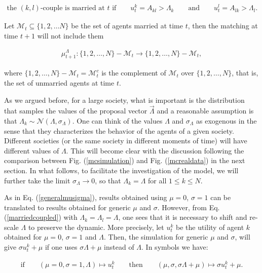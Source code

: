 \documentclass[12pt]{article}
\begin{document}
\begin{align}
    \textrm{the $(k,l)$-couple is married at $t$ if}\qquad u^k_t=A_{kl}>\Lambda_k\qquad \textrm{and}\qquad u^l_t=A_{lk}>\Lambda_l.
    \label{marriedcoupled}
\end{align}

\noindent Let $\mathcal{M}_{t}\subseteq\{1,2,\dots N\}$ be the set of agents married at time $t$, then the matching at time $t+1$ will not include them

\begin{align}
    \mu_{t+1}^\Lambda:\{1,2,\dots,N\}-\mathcal{M}_{t}\rightarrow\{1,2,\dots,N\}-\mathcal{M}_{t},
    \label{marriedcouples}
\end{align}

\noindent where $\{1,2,\dots,N\}-\mathcal{M}_{t}=\mathcal{M}^c_t$ is the complement of $\mathcal{M}_t$ over $\{1,2,\dots,N\}$, that is, the set of unmarried agents at time $t$.

As we argued before, for a large society, what is important is the distribution that samples the values of the proposal vector $\vec{\Lambda}$ and a reasonable assumption is that $\Lambda_k\sim\mathcal{N}(\Lambda,\sigma_\Lambda)$. One can think of the values $\Lambda$ and $\sigma_\Lambda$ as exogenous in the sense that they characterizes the behavior of the agents of a given society. Different societies (or the same society in different moments of time) will have different values of $\Lambda$. This will become clear with the discussion following the comparison between Fig. (\ref{mcsimulation}) and Fig. (\ref{mcrealdata}) in the next section. In what follows, to facilitate the investigation of the model, we will further take the limit $\sigma_\Lambda\rightarrow0$, so that $\Lambda_k=\Lambda$ for all $1\leq k\leq N$.

As in Eq. (\ref{generalmusigma}), results obtained using $\mu=0$, $\sigma=1$ can be translated to results obtained for generic $\mu$ and $\sigma$. However, from Eq. (\ref{marriedcoupled}) with $\Lambda_k=\Lambda_l=\Lambda$, one sees that it is necessary to shift and re-scale $\Lambda$ to preserve the dynamic. More precisely, let $u_t^k$ be the utility of agent $k$ obtained for $\mu=0$, $\sigma=1$ and $\Lambda$. Then, the simulation for generic $\mu$ and $\sigma$, will give $\sigma u_t^k+\mu$ if one uses $\sigma\Lambda+\mu$ instead of $\Lambda$. In symbols we have:

\begin{align}
    \textrm{if}\qquad (\mu=0,\sigma=1,\Lambda)\mapsto u_t^k\qquad\textrm{then}\qquad (\mu,\sigma,\sigma\Lambda+\mu)\mapsto \sigma u_t^k+\mu.
    \label{dictionarymarried}
\end{align}
\end{document}
